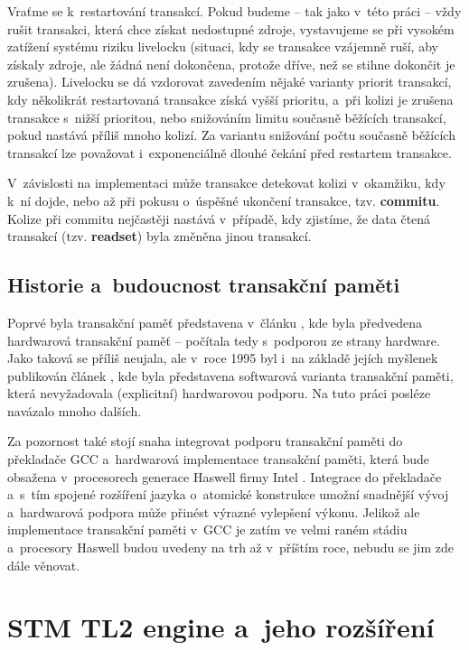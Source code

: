 Vraťme se k~restartování transakcí.
Pokud budeme -- tak jako v~této práci -- vždy rušit transakci, která chce získat
nedostupné zdroje, vystavujeme se při vysokém zatížení systému riziku livelocku
(situaci, kdy se transakce
vzájemně ruší, aby získaly zdroje, ale žádná není dokončena, protože dříve, než se
stihne dokončit je zrušena). Livelocku se dá vzdorovat zavedením nějaké varianty priorit
transakcí, kdy několikrát restartovaná transakce získá vyšší prioritu, a~při kolizi
je zrušena transakce s~nižší prioritou, nebo snižováním limitu současně běžících
transakcí, pokud nastává příliš mnoho kolizí. Za variantu snižování počtu současně
běžících transakcí lze považovat i~exponenciálně dlouhé čekání před restartem transakce.

V~závislosti na implementaci může transakce detekovat kolizi v~okamžiku, kdy
k~ní dojde, nebo až při pokusu o~úspěšné ukončení transakce, tzv. {\bf commitu}.
Kolize při commitu nejčastěji nastává v~případě, kdy zjistíme, že data čtená
transakcí (tzv. {\bf readset}) byla změněna jinou transakcí.


\subsection{Historie a~budoucnost transakční paměti}
Poprvé byla transakční paměť představena v~článku \cite{HTM}, kde byla předvedena
hardwarová transakční paměť -- počítala tedy s~podporou ze strany hardware. Jako
taková se příliš neujala, ale v~roce 1995 byl i~na základě jejích myšlenek publikován
článek \cite{STM95}, kde byla představena softwarová varianta transakční paměti,
která nevyžadovala (explicitní) hardwarovou podporu. Na tuto práci posléze
navázalo mnoho dalších.

Za pozornost také stojí snaha integrovat podporu transakční paměti do překladače
GCC \cite{gccTM} a~hardwarová implementace transakční paměti, která bude obsažena
v~procesorech generace Haswell firmy Intel \cite{haswellTM}. 
Integrace do překladače a~s~tím spojené rozšíření jazyka
o~atomické konstrukce umožní snadnější vývoj a~hardwarová podpora může přinést výrazné
vylepšení výkonu. Jelikož ale implementace transakční paměti v~GCC je zatím ve velmi
raném stádiu a~procesory Haswell budou uvedeny na trh až v~příštím roce, nebudu
se jim zde dále věnovat.


\section{STM TL2 engine a~jeho rozšíření}

